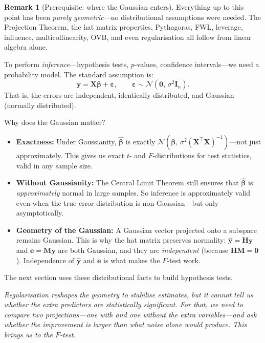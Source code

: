 \documentclass[11pt,a4paper]{article}
\theoremstyle{plain}
\theoremstyle{definition}
\newtheorem{remark}[theorem]{Remark}
\newcommand{\yhat}{\hat{\bm{y}}}
\newcommand{\bhat}{\hat{\bm{\beta}}}
\newcommand{\bX}{\bm{X}}
\newcommand{\by}{\bm{y}}
\newcommand{\be}{\bm{e}}
\newcommand{\bH}{\bm{H}}
\newcommand{\bM}{\bm{M}}
\newcommand{\bI}{\bm{I}}
\begin{document}

\medskip
\begin{remark}[Prerequisite: where the Gaussian enters]
Everything up to this point has been \emph{purely geometric}---no
distributional assumptions were needed.
The Projection Theorem, the hat matrix properties, Pythagoras, FWL,
leverage, influence, multicollinearity, OVB, and even regularisation
all follow from linear algebra alone.

To perform \emph{inference}---hypothesis tests, $p$-values, confidence
intervals---we need a probability model.
The standard assumption is:
\[
  \by = \bX\bm{\beta} + \bm{\varepsilon},
  \qquad
  \bm{\varepsilon} \sim \mathcal{N}(\bm{0},\, \sigma^2 \bI_n).
\]
That is, the errors are independent, identically distributed, and
Gaussian (normally distributed).

Why does the Gaussian matter?
\begin{itemize}[nosep]
  \item \textbf{Exactness:} Under Gaussianity, $\bhat$ is exactly
        $\mathcal{N}(\bm{\beta},\, \sigma^2(\bX^\top\bX)^{-1})$---not
        just approximately. This gives us exact $t$- and $F$-distributions
        for test statistics, valid in any sample size.
  \item \textbf{Without Gaussianity:} The Central Limit Theorem still
        ensures that $\bhat$ is \emph{approximately} normal in large samples.
        So inference is approximately valid even when the true error
        distribution is non-Gaussian---but only asymptotically.
  \item \textbf{Geometry of the Gaussian:} A Gaussian vector projected
        onto a subspace remains Gaussian. This is why the hat matrix
        preserves normality: $\yhat = \bH\by$ and
        $\be = \bM\by$ are both Gaussian, and they are
        \emph{independent} (because $\bH\bM = \bm{0}$).
        Independence of $\yhat$ and $\be$ is what makes the $F$-test work.
\end{itemize}
The next section uses these distributional facts to build hypothesis tests.
\end{remark}

\medskip
\noindent\textit{Regularisation reshapes the geometry to stabilise
estimates, but it cannot tell us whether the extra predictors are
\emph{statistically significant}.
For that, we need to compare two projections---one with and one
without the extra variables---and ask whether the improvement is
larger than what noise alone would produce.
This brings us to the $F$-test.}
\end{document}
